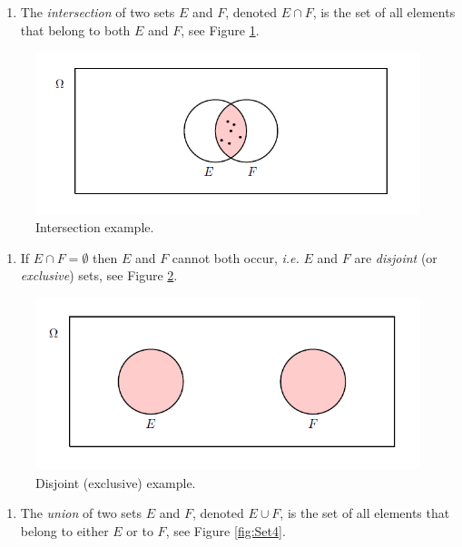 \documentclass[
]{book}
\providecommand{\tightlist}{%
  \setlength{\itemsep}{0pt}\setlength{\parskip}{0pt}}
\begin{document}
\begin{enumerate}
\def\labelenumi{\arabic{enumi}.}
\setcounter{enumi}{3}
\tightlist
\item
  The \emph{intersection} of two sets \(E\) and \(F\), denoted \(E \cap F\), is the set of all elements that belong to both \(E\) and \(F\), see Figure \ref{fig:Set2}.
\end{enumerate}

\begin{figure}
\includegraphics[width=0.8\linewidth]{Images/Set2} \caption{ Intersection example.}\label{fig:Set2}
\end{figure}

\begin{enumerate}
\def\labelenumi{\arabic{enumi}.}
\setcounter{enumi}{4}
\tightlist
\item
  If \(E \cap F = \emptyset\) then \(E\) and \(F\) cannot both occur, \emph{i.e.} \(E\) and \(F\)
  are \emph{disjoint} (or \emph{exclusive}) sets, see Figure \ref{fig:Set3}.
\end{enumerate}

\begin{figure}
\includegraphics[width=0.8\linewidth]{Images/Set3} \caption{ Disjoint (exclusive) example.}\label{fig:Set3}
\end{figure}

\begin{enumerate}
\def\labelenumi{\arabic{enumi}.}
\setcounter{enumi}{5}
\tightlist
\item
  The \emph{union} of two sets \(E\) and \(F\), denoted \(E \cup F\), is the set of all elements that belong to either \(E\) or to \(F\), see Figure \ref{fig:Set4}.
\end{enumerate}
\end{document}
